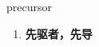 
\begin{frame}
{\huge precursor}
\begin{center}
\begin{enumerate}\Large
  \item \textbf{先驱者，先导}
\end{enumerate}
\end{center}
\end{frame}
